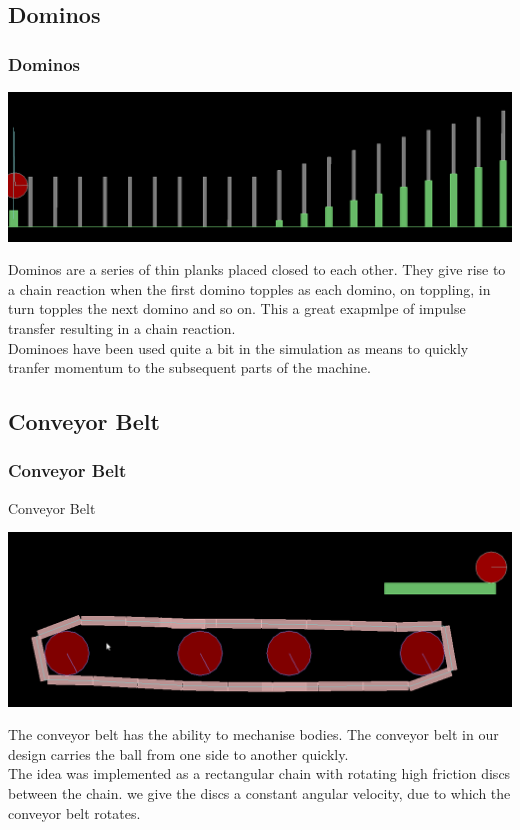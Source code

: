 \subsection{Dominos}
\begin{frame}
\frametitle{Dominos}
\begin{center}
\includegraphics[scale=.25]{./Images/LowerDominos.png}
\end{center}
Dominos are a series of thin planks placed closed to each other. They give rise to a chain reaction when the first domino topples as each domino, on toppling, in turn topples the next domino and so on. This a great exapmlpe of impulse transfer resulting in a chain reaction.
\\
\pause
Dominoes have been used quite a bit in the simulation as means to quickly tranfer momentum to the subsequent parts of the machine.
\end{frame} 

\subsection{Conveyor Belt}
\begin{frame}
\frametitle{Conveyor Belt}{Conveyor Belt}
\begin{center}
\includegraphics[scale=.25]{./Images/ConveyorBelt.png}
\end{center}
The conveyor belt has the ability to mechanise bodies. The conveyor belt in our design carries the ball from one side to another quickly. 
\\
\pause
The idea was implemented as a rectangular chain with rotating high friction discs between the chain. we give the discs a constant angular velocity, due to which the conveyor belt rotates.
\end{frame}

